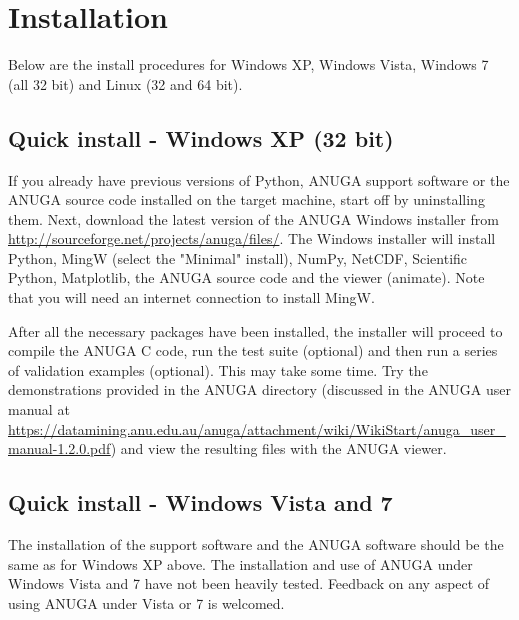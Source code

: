 \documentclass{manual}
\begin{document}
\section{Installation}

Below are the install procedures for Windows XP, Windows Vista, Windows 7 (all 32 bit) and Linux (32 and 64 bit).

\subsection{Quick install - Windows XP (32 bit)}
\label{sec:winxp}

If you already have previous versions of Python, ANUGA support software or the ANUGA source code installed 
on the target machine, start off by uninstalling them. Next, download the latest version of the ANUGA 
Windows installer from \url{http://sourceforge.net/projects/anuga/files/}. The Windows installer will 
install Python, MingW (select the "Minimal" install), NumPy, NetCDF, Scientific Python, Matplotlib, the 
ANUGA source code and the viewer (animate). Note that you will need an internet connection to install MingW.

After all the necessary packages have been installed, the installer will proceed to compile the ANUGA C code, 
run the test suite (optional) and then run a series of validation examples (optional). This may take some time.
Try the demonstrations provided in the ANUGA directory  (discussed in the ANUGA user manual at 
\url{https://datamining.anu.edu.au/anuga/attachment/wiki/WikiStart/anuga_user_manual-1.2.0.pdf}) 
and view the resulting  files with the ANUGA viewer.




\subsection{Quick install - Windows Vista and 7}
\label{sec:winvista}

The installation of the support software and the ANUGA software should be the same as for Windows XP above.
The installation and use of ANUGA under Windows Vista and 7 have not been heavily tested.  Feedback on any aspect
of using ANUGA under Vista or 7 is welcomed.
\end{document}
